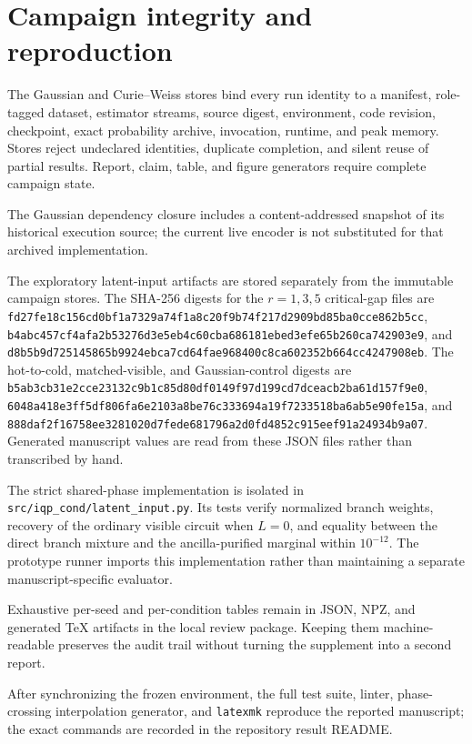 \section{Campaign integrity and reproduction}
\label{app:reproduction}

The Gaussian and Curie--Weiss stores bind every run identity to a manifest,
role-tagged dataset, estimator streams, source digest, environment, code
revision, checkpoint, exact probability archive, invocation, runtime, and peak
memory. Stores reject undeclared identities, duplicate completion, and silent
reuse of partial results. Report, claim, table, and figure generators require
complete campaign state.

The Gaussian dependency closure includes a content-addressed snapshot of its
historical execution source; the current live encoder is not substituted for
that archived implementation.

{\raggedright
The exploratory latent-input artifacts are stored separately from the
immutable campaign stores. The SHA-256 digests for the $r=1,3,5$ critical-gap
files are
\texttt{fd27fe18c156cd0bf1a7329a74f1a8c20f9b74f217d2909bd85ba0cce862b5cc},
\texttt{b4abc457cf4afa2b53276d3e5eb4c60cba686181ebed3efe65b260ca742903e9},
and
\texttt{d8b5b9d725145865b9924ebca7cd64fae968400c8ca602352b664cc4247908eb}.
The hot-to-cold, matched-visible, and Gaussian-control digests are
\texttt{b5ab3cb31e2cce23132c9b1c85d80df0149f97d199cd7dceacb2ba61d157f9e0},
\texttt{6048a418e3ff5df806fa6e2103a8be76c333694a19f7233518ba6ab5e90fe15a},
and
\texttt{888daf2f16758ee3281020d7fede681796a2d0fd4852c915eef91a24934b9a07}.
Generated manuscript values are read from these JSON files rather than
transcribed by hand.\par}

The strict shared-phase implementation is isolated in
\texttt{src/iqp\_cond/latent\_input.py}. Its tests verify normalized branch
weights, recovery of the ordinary visible circuit when $L=0$, and equality
between the direct branch mixture and the ancilla-purified marginal within
$10^{-12}$. The prototype runner imports this implementation rather than
maintaining a separate manuscript-specific evaluator.

Exhaustive per-seed and per-condition tables remain in JSON, NPZ, and generated
TeX artifacts in the local review package. Keeping them machine-readable
preserves the audit trail without turning the supplement into a second report.

After synchronizing the frozen environment, the full test suite, linter,
phase-crossing interpolation generator, and \texttt{latexmk} reproduce the
reported manuscript; the exact commands are recorded in the repository result
README.


